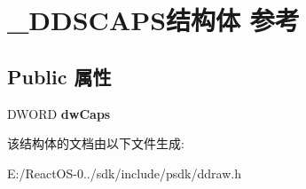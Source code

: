 \hypertarget{struct___d_d_s_c_a_p_s}{}\section{\+\_\+\+D\+D\+S\+C\+A\+P\+S结构体 参考}
\label{struct___d_d_s_c_a_p_s}
\subsection*{Public 属性}
\begin{DoxyCompactItemize}
\item 
\mbox{\label{struct___d_d_s_c_a_p_s_a3e9066dc36fbd6b796e67c957f7cd569}} 
D\+W\+O\+RD {\bfseries dw\+Caps}
\end{DoxyCompactItemize}


该结构体的文档由以下文件生成\+:\begin{DoxyCompactItemize}
\item 
E\+:/\+React\+O\+S-\/0../sdk/include/psdk/ddraw.\+h\end{DoxyCompactItemize}
